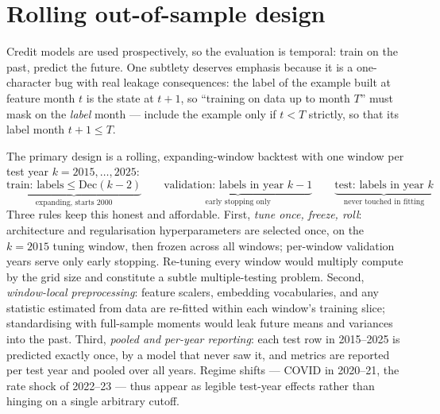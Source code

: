 \section{Rolling out-of-sample design}
\label{sec:meth-design}

Credit models are used prospectively, so the evaluation is temporal:
train on the past, predict the future.  One subtlety deserves
emphasis because it is a one-character bug with real leakage
consequences: the label of the example built at feature month $t$ is
the state at $t{+}1$, so ``training on data up to month $T$'' must
mask on the \emph{label} month --- include the example only if
$t < T$ strictly, so that its label month $t{+}1 \le T$.

The primary design is a rolling, expanding-window backtest with one
window per test year $k = 2015,\dots,2025$:
\[
\underbrace{\text{train: labels} \le \mathrm{Dec}(k{-}2)}_{\text{expanding, starts 2000}}
\qquad
\underbrace{\text{validation: labels in year } k{-}1}_{\text{early stopping only}}
\qquad
\underbrace{\text{test: labels in year } k}_{\text{never touched in fitting}}
\]
Three rules keep this honest and affordable.  First,
\emph{tune once, freeze, roll}: architecture and regularisation
hyperparameters are selected once, on the $k{=}2015$ tuning window,
then frozen across all windows; per-window validation years serve
only early stopping.  Re-tuning every window would multiply compute
by the grid size and constitute a subtle multiple-testing problem.
Second, \emph{window-local preprocessing}: feature scalers, embedding
vocabularies, and any statistic estimated from data are re-fitted
within each window's training slice; standardising with full-sample
moments would leak future means and variances into the past.  Third,
\emph{pooled and per-year reporting}: each test row in 2015--2025 is
predicted exactly once, by a model that never saw it, and metrics are
reported per test year and pooled over all years.  Regime shifts ---
COVID in 2020--21, the rate shock of 2022--23 --- thus appear as
legible test-year effects rather than hinging on a single arbitrary
cutoff.

